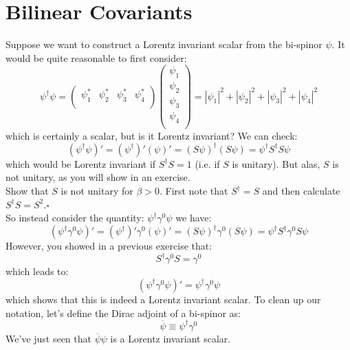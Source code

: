\documentclass[12pt]{article}
\begin{document}
\section{Bilinear Covariants}

Suppose we want to construct a Lorentz invariant scalar from
the bi-spinor $\psi$. It would be quite reasonable to first consider:
$$\psi^\dagger \psi =
\begin{pmatrix}
\psi_1^* & \psi_2^* & \psi_3^* & \psi_4^* \\
\end{pmatrix}
\begin{pmatrix}
\psi_1 \\ \psi_2 \\ \psi_3 \\ \psi_4 \\
\end{pmatrix}
= |\psi_1|^2 + |\psi_2|^2+ |\psi_3|^2 + |\psi_4|^2
$$
which is certainly a scalar, but is it Lorentz invariant?  We can check:
$$\left( {\psi}^\dagger \psi \right)' =
\left( {\psi}^\dagger\right)' \left( \psi \right)'
= (S \psi)^\dagger (S \psi) = \psi^\dagger S^\dagger S \psi$$
which would be Lorentz invariant if $S^\dagger S = 1$ (i.e. if $S$ is
unitary).  But alas, $S$ is not unitary, as you will show in an
exercise.\\[5pt]

\exercise
Show that $S$ is not unitary for $\beta > 0$.  First note that
$S^\dagger = S$ and then calculate $S^\dagger S = S^2$.$\square$\\[5pt]

So instead consider the quantity:
$\psi^\dagger \gamma^0 \psi$
we have:
$$\left( {\psi}^\dagger \gamma^0 \psi \right)' =
\left( {\psi}^\dagger\right)' \gamma^0 \left( \psi \right)'
= (S \psi)^\dagger \gamma^0 (S \psi) = \psi^\dagger S^\dagger \gamma^0 S \psi$$
However, you showed in a previous exercise that:
$$S^\dagger \gamma^0 S = \gamma^0$$
which leads to:
$$\left( {\psi}^\dagger \gamma^0 \psi \right)' = {\psi}^\dagger \gamma^0 \psi$$
which shows that this is indeed a Lorentz invariant scalar.  To clean up our notation, let's define the Dirac adjoint of a bi-spinor as:
$$\overline{\psi} \equiv \psi^\dagger \gamma^0 $$
We've just seen that $\overline{\psi} \psi$ is a Lorentz invariant scalar.
\end{document}
